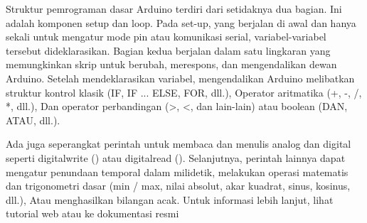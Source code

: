 	Struktur pemrograman dasar Arduino terdiri dari setidaknya dua bagian. Ini adalah komponen setup dan loop. Pada set-up, yang berjalan di awal dan hanya sekali untuk mengatur mode pin atau komunikasi serial, variabel-variabel tersebut dideklarasikan. Bagian kedua berjalan dalam satu lingkaran yang memungkinkan skrip untuk berubah, merespons, dan mengendalikan dewan Arduino. Setelah mendeklarasikan variabel, mengendalikan Arduino melibatkan struktur kontrol klasik (IF, IF ... ELSE, FOR, dll.), Operator aritmatika (+, -, /, *, dll.), Dan operator perbandingan (>, <, dan lain-lain) atau boolean (DAN, ATAU, dll.). 
	
	Ada juga seperangkat perintah untuk membaca dan menulis analog dan digital seperti digitalwrite () atau digitalread (). Selanjutnya, perintah lainnya dapat mengatur penundaan temporal dalam milidetik, melakukan operasi matematis dan trigonometri dasar (min / max, nilai absolut, akar kuadrat, sinus, kosinus, dll.), Atau menghasilkan bilangan acak. Untuk informasi lebih lanjut, lihat tutorial web atau ke dokumentasi resmi 